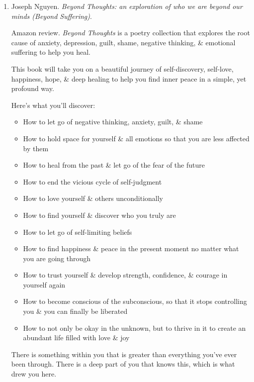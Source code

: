 \documentclass{article}
\begin{document}
\begin{enumerate}
\begin{itemize}
	\end{itemize}
	{\sf About the Author.} {\sc Joseph Nguyen} is a spiritual thought leader who has a mission of helping others realize their divine purpose, unlock the infinite potential of their own mind, \& live an abundant life free from psychological suffering. He spends most of his time writing, coaching, teaching, speaking, \& sharing timeless wisdom to help people discover their own divinity from within \& how they are the answer they've been looking for their entire lives.
	\item {\sc Joseph Nguyen}. {\it Beyond Thoughts: an exploration of who we are beyond our minds (Beyond Suffering)}. {}

	{\sf Amazon review.} {\it Beyond Thoughts} is a poetry collection that explores the root cause of anxiety, depression, guilt, shame, negative thinking, \& emotional suffering to help you heal.

	This book will take you on a beautiful journey of self-discovery, self-love, happiness, hope, \& deep healing to help you find inner peace in a simple, yet profound way.

	Here's what you'll discover:
	\begin{itemize}
		\item How to let go of negative thinking, anxiety, guilt, \& shame
		\item How to hold space for yourself \& all emotions so that you are less affected by them
		\item How to heal from the past \& let go of the fear of the future
		\item How to end the vicious cycle of self-judgment
		\item How to love yourself \& others unconditionally
		\item How to find yourself \& discover who you truly are
		\item How to let go of self-limiting beliefs
		\item How to find happiness \& peace in the present moment no matter what you are going through
		\item How to trust yourself \& develop strength, confidence, \& courage in yourself again
		\item How to become conscious of the subconscious, so that it stops controlling you \& you can finally be liberated
		\item How to not only be okay in the unknown, but to thrive in it to create an abundant life filled with love \& joy
	\end{itemize}
	There is something within you that is greater than everything you've ever been through. There is a deep part of you that knows this, which is what drew you here.


\end{enumerate}
\end{document}
